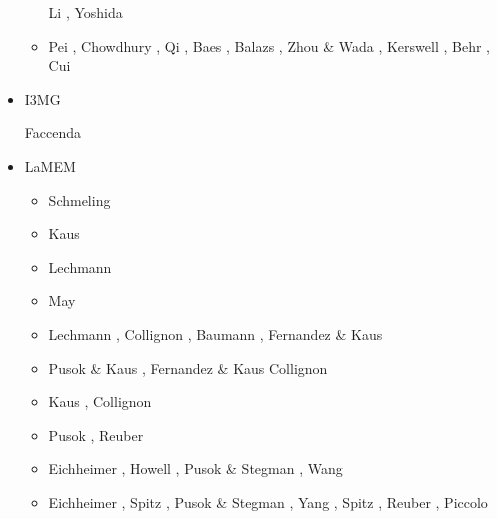 \begin{itemize}
\begin{scriptsize}
\begin{itemize}
                    Li \etal \cite{lisy20}, Yoshida \etal \cite{yosy20b}
\item[\twothousandtwentyone]  Pei \etal \cite{pels21}, Chowdhury \etal \cite{chcg21},
                              Qi \etal \cite{qill21}, Baes \etal \cite{basg21}, 
                              Balazs \etal \cite{bafu21}, Zhou \& Wada \cite{zhwa21},
                              Kerswell \etal \cite{kekg21}, Behr \etal \cite{begc21},
                              Cui \etal \cite{cull21}
\end{itemize}
\end{scriptsize}


\item I3MG


\begin{scriptsize}
\twothousandfourteen Faccenda \cite{facc14}
\end{scriptsize}


\item LaMEM 

\begin{scriptsize}
\begin{itemize}
\item[\twothousandeight] Schmeling \etal \cite{scbe08}
\item[\twothousandten] Kaus \etal \cite{kamm10}
\item[\twothousandeleven] Lechmann \etal \cite{lemk11}
\item[\twothousandtwelve] May \cite{may12}
\item[\twothousandfourteen] Lechmann \etal \cite{lesh14}, Collignon \etal \cite{cokm14}, 
                            Baumann \etal \cite{bakp14}, 
                            Fernandez \& Kaus \cite{feka14a,feka14b}
\item[\twothousandfifteen] Pusok \& Kaus \cite{puka15}, Fernandez \& Kaus \cite{feka15}
                           Collignon \etal \cite{cofk15}
\item[\twothousandsixteen] Kaus \etal \cite{kapb16}, Collignon \etal \cite{coyc16}
\item[\twothousandeighteen] Pusok \etal \cite{pukp18}, Reuber \etal \cite{rekp18,repk18}
\item[\twothousandnineteen] Eichheimer \etal \cite{eitp19}, Howell \etal \cite{hooi19}, 
                            Pusok \& Stegman \cite{pust19}, Wang \etal \cite{wakz19}
\item[\twothousandtwenty] Eichheimer \etal \cite{eitf20}, Spitz \etal \cite{spsk20}, 
                          Pusok \& Stegman \cite{pust20}, Yang \etal \cite{yakl20}, 
                          Spitz \etal \cite{spbe20}, Reuber \etal \cite{rehp20},
                          Piccolo \etal \cite{pikw20}
\end{itemize}
\end{scriptsize}


\end{itemize}

